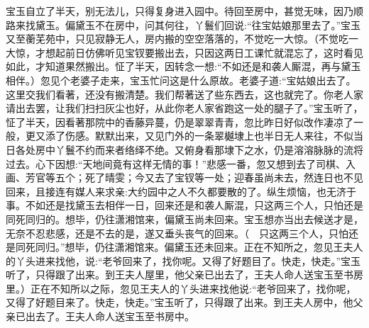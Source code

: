 \begin{parag}
    宝玉自立了半天，别无法儿，只得复身进入园中。待回至房中，甚觉无味，因乃顺路来找黛玉。偏黛玉不在房中，问其何往，丫鬟们回说:“往宝姑娘那里去了。”宝玉又至蘅芜苑中，只见寂静无人，房内搬的空空落落的，不觉吃一大惊。（不觉吃一大惊，才想起前日仿佛听见宝钗要搬出去，只因这两日工课忙就混忘了，这时看见如此，才知道果然搬出。怔了半天，因转念一想:“不如还是和袭人厮混，再与黛玉相伴。）忽见个老婆子走来，宝玉忙问这是什么原故。老婆子道:“宝姑娘出去了。这里交我们看著，还没有搬清楚。我们帮著送了些东西去，这也就完了。你老人家请出去罢，让我们扫扫灰尘也好，从此你老人家省跑这一处的腿子了。”宝玉听了，怔了半天，因看著那院中的香藤异蔓，仍是翠翠青青，忽比昨日好似改作凄凉了一般，更又添了伤感。默默出来，又见门外的一条翠樾埭上也半日无人来往，不似当日各处房中丫鬟不约而来者络绎不绝。又俯身看那埭下之水，仍是溶溶脉脉的流将过去。心下因想:“天地间竟有这样无情的事！”悲感一番，忽又想到去了司棋、入画、芳官等五个；死了晴雯；今又去了宝钗等一处；迎春虽尚未去，然连日也不见回来，且接连有媒人来求亲:大约园中之人不久都要散的了。纵生烦恼，也无济于事。不如还是找黛玉去相伴一日，回来还是和袭人厮混，只这两三个人，只怕还是同死同归的。想毕，仍往潇湘馆来，偏黛玉尚未回来。宝玉想亦当出去候送才是，无奈不忍悲感，还是不去的是，遂又垂头丧气的回来。（　只这两三个人，只怕还是同死同归。”想毕，仍往潇湘馆来。偏黛玉还未回来。正在不知所之，忽见王夫人的丫头进来找他，说:“老爷回来了，找你呢。又得了好题目了。快走，快走。”宝玉听了，只得跟了出来。到王夫人屋里，他父亲已出去了，王夫人命人送宝玉至书房里。）正在不知所以之际，忽见王夫人的丫头进来找他说:“老爷回来了，找你呢，又得了好题目来了。快走，快走。”宝玉听了，只得跟了出来。到王夫人房中，他父亲已出去了。王夫人命人送宝玉至书房中。
\end{parag}


